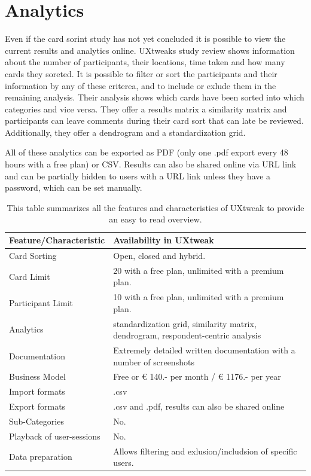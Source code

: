 \section{Analytics}
Even if the card sorint study has not yet concluded it is possible to view the 
current results and analytics online. UXtweaks study review shows information 
about the number of participants, their locations, time taken and how many 
cards they soreted. It is possible to filter or sort the participants and their 
information by any of these criterea, and to include or exlude them in the 
remaining analysis. Their analysis shows which cards have been sorted into 
which categories and vice versa. They offer a results matrix a similarity matrix
and participants can leave comments during their card sort that can late be 
reviewed. Additionally, they offer a dendrogram and a standardization grid.

All of these analytics can be exported as PDF (only one .pdf export every 48 
hours with a free plan) or CSV. Results can also be shared online via URL link 
and can be partially hidden to users with a URL link unless they have a 
password, which can be set manually.

\begin{table}[tp]
\centering
\begin{tabularx}
{\linewidth}{|l|X|}
\hline \textbf{Feature/Characteristic} & \textbf{Availability in UXtweak} \\ 
\hline Card Sorting & Open, closed and hybrid. \\ 
\hline Card Limit & 20 with a free plan, unlimited with a premium plan. \\
\hline Participant Limit & 10 with a free plan, unlimited with a premium 
plan.\\
\hline Analytics & standardization grid, similarity matrix, dendrogram,
 respondent-centric analysis \\ 
\hline Documentation & Extremely detailed written documentation with a 
number of screenshots \\
\hline Business Model & Free or € 140.- per month / € 1176.- per year \\
\hline Import formats & .csv\\ 
\hline Export formats & .csv and .pdf, results can also be shared online \\ 
\hline Sub-Categories & No. \\ 
\hline Playback of user-sessions & No. \\ 
\hline Data preparation & Allows filtering and exlusion/includsion of specific
 users. \\ 
\hline
\end{tabularx} 
\caption[Feature summary of UXtweak] 
{ 
This table summarizes all the features and characteristics of UXtweak
to provide an easy to read overview.
}
\label{tab:features-UXtweak}
\end{table}


